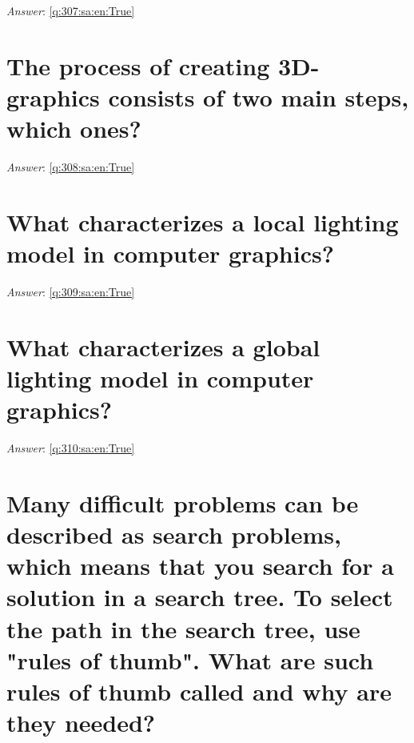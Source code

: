 \documentclass[a4paper,11pt,oneside]{book}
\begin{document}
\begin{sloppypar}
\noindent\makebox[\textwidth]{\hrulefill}

\vspace{1cm}

\textit{Answer}: \autoref{q:307:sa:en:True}



\section{The process of creating 3D-graphics consists of two main steps, which ones?}

\label{q:308:sa:en:False}

\vspace{2cm}

\noindent\makebox[\textwidth]{\hrulefill}

\vspace{1cm}

\textit{Answer}: \autoref{q:308:sa:en:True}



\section{What characterizes a local lighting model in computer graphics?}

\label{q:309:sa:en:False}

\vspace{2cm}

\noindent\makebox[\textwidth]{\hrulefill}

\vspace{1cm}

\textit{Answer}: \autoref{q:309:sa:en:True}



\section{What characterizes a global lighting model in computer graphics?}

\label{q:310:sa:en:False}

\vspace{2cm}

\noindent\makebox[\textwidth]{\hrulefill}

\vspace{1cm}

\textit{Answer}: \autoref{q:310:sa:en:True}



\section{Many difficult problems can be described as search problems, which means that you search for a solution in a search tree. To select the path in the search tree, use "rules of thumb". What are such rules of thumb called and why are they needed?}


\end{sloppypar}
\end{document}
